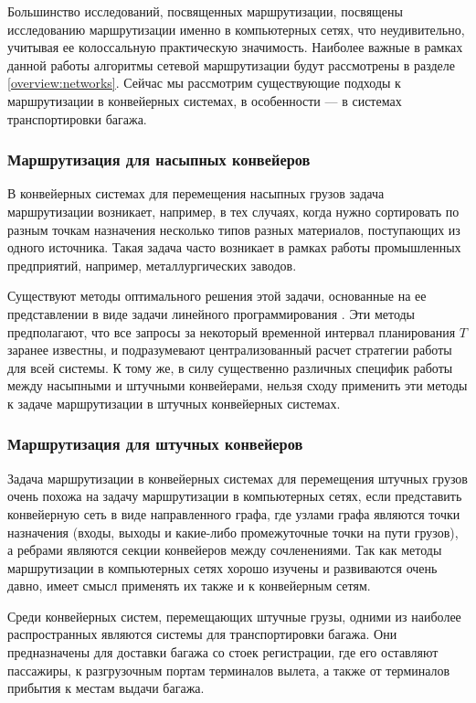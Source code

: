 \documentclass[specification,annotation,times]{itmo-student-thesis}
\theoremstyle{definition}
\begin{document}
Большинство исследований, посвященных маршрутизации, посвящены исследованию
маршрутизации именно в компьютерных сетях, что неудивительно, учитывая ее
колоссальную практическую значимость. Наиболее важные в рамках данной работы
алгоритмы сетевой маршрутизации будут рассмотрены в разделе
\ref{overview:networks}. Сейчас мы рассмотрим существующие подходы к
маршрутизации в конвейерных системах, в особенности --- в системах
транспортировки багажа.

\subsubsection{Маршрутизация для насыпных конвейеров}\label{overview:japans}

В конвейерных системах для перемещения насыпных грузов задача маршрутизации
возникает, например, в тех случаях, когда нужно сортировать по разным точкам
назначения несколько типов разных материалов, поступающих из одного источника.
Такая задача часто возникает в рамках работы промышленных предприятий, например,
металлургических заводов.

Существуют методы оптимального решения этой задачи, основанные на ее
представлении в виде задачи линейного программирования
\cite{ago2007simultaneous}. Эти методы предполагают, что все запросы за
некоторый временной интервал планирования $T$ заранее известны, и подразумевают
централизованный расчет стратегии работы для всей системы. К тому же, в силу
существенно различных специфик работы между насыпными и штучными конвейерами,
нельзя сходу применить эти методы к задаче маршрутизации в штучных конвейерных
системах.

\subsubsection{Маршрутизация для штучных конвейеров}

Задача маршрутизации в конвейерных системах для перемещения штучных грузов очень
похожа на задачу маршрутизации в компьютерных сетях, если представить
конвейерную сеть в виде направленного графа, где узлами графа являются точки
назначения (входы, выходы и какие-либо промежуточные точки на пути грузов), а
ребрами являются секции конвейеров между сочленениями. Так как методы
маршрутизации в компьютерных сетях хорошо изучены и развиваются очень давно,
имеет смысл применять их также и к конвейерным сетям.

Среди конвейерных систем, перемещающих штучные грузы, одними из наиболее
распространных являются системы для транспортировки багажа. Они предназначены
для доставки багажа со стоек регистрации, где его оставляют пассажиры, к
разгрузочным портам терминалов вылета, а также от терминалов прибытия к местам
выдачи багажа.
\end{document}
